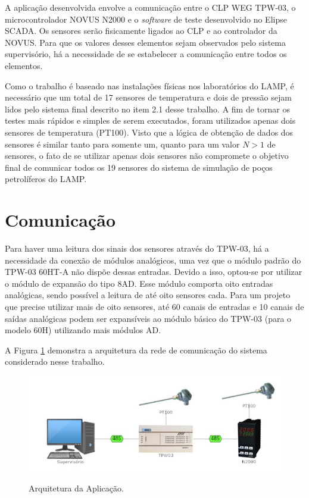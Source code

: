 \label{Cap:implementacoes}

A aplicação desenvolvida envolve a comunicação entre o CLP WEG TPW-03, o microcontrolador NOVUS N2000 e o \textit{software} de teste desenvolvido no Elipse SCADA. Os sensores serão fisicamente ligados ao CLP e ao controlador da NOVUS. Para que os valores desses elementos sejam observados pelo sistema supervisório, há a necessidade de se estabelecer a comunicação entre todos os elementos.

Como o trabalho é baseado nas instalações físicas nos laboratórios do LAMP, é necessário que um total de 17 sensores de temperatura e dois de pressão sejam lidos pelo sistema final descrito no item 2.1 desse trabalho. A fim de tornar os testes mais rápidos e simples de serem executados, foram utilizados apenas dois sensores de temperatura (PT100). Visto que a lógica de obtenção de dados dos sensores é similar tanto para somente um, quanto para um valor $N>1$ de sensores, o fato de se utilizar apenas dois sensores não compromete o objetivo final de comunicar todos os 19 sensores do sistema de simulação de poços petrolíferos do LAMP.

\section{Comunicação}
Para haver uma leitura dos sinais dos sensores através do TPW-03, há a necessidade da conexão de módulos analógicos, uma vez que o módulo padrão do TPW-03 60HT-A não dispõe dessas entradas. Devido a isso, optou-se por utilizar o módulo de expansão do tipo 8AD. Esse módulo comporta oito entradas analógicas, sendo possível a leitura de até oito sensores cada. Para um projeto que precise utilizar mais de oito sensores, até 60 canais de entradas e 10 canais de saídas analógicas podem ser expansíveis ao módulo básico do TPW-03 (para o modelo 60H) utilizando mais módulos AD.

A Figura \ref{fig:ArquiteturaComunicacao} demonstra a arquitetura da rede de comunicação do sistema considerado nesse trabalho.

\begin{figure}[h!]
  \center
  \includegraphics[scale=0.9]{ArquiteturaComunicacao.jpg}
  \label{fig:ArquiteturaComunicacao}
  \caption{Arquitetura da Aplicação.}
\end{figure}


